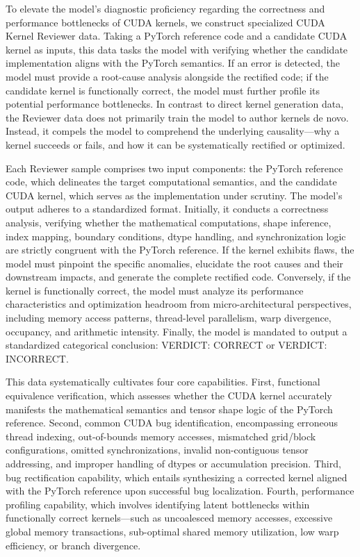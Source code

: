 \documentclass[
  10
]{article}
\begin{document}
To elevate the model's diagnostic proficiency regarding the correctness
and performance bottlenecks of CUDA kernels, we construct specialized
CUDA Kernel Reviewer data. Taking a PyTorch reference code and a
candidate CUDA kernel as inputs, this data tasks the model with
verifying whether the candidate implementation aligns with the PyTorch
semantics. If an error is detected, the model must provide a root-cause
analysis alongside the rectified code; if the candidate kernel is
functionally correct, the model must further profile its potential
performance bottlenecks. In contrast to direct kernel generation data,
the Reviewer data does not primarily train the model to author kernels
de novo. Instead, it compels the model to comprehend the underlying
causality---why a kernel succeeds or fails, and how it can be
systematically rectified or optimized.

Each Reviewer sample comprises two input components: the PyTorch
reference code, which delineates the target computational semantics, and
the candidate CUDA kernel, which serves as the implementation under
scrutiny. The model's output adheres to a standardized format.
Initially, it conducts a correctness analysis, verifying whether the
mathematical computations, shape inference, index mapping, boundary
conditions, dtype handling, and synchronization logic are strictly
congruent with the PyTorch reference. If the kernel exhibits flaws, the
model must pinpoint the specific anomalies, elucidate the root causes
and their downstream impacts, and generate the complete rectified code.
Conversely, if the kernel is functionally correct, the model must
analyze its performance characteristics and optimization headroom from
micro-architectural perspectives, including memory access patterns,
thread-level parallelism, warp divergence, occupancy, and arithmetic
intensity. Finally, the model is mandated to output a standardized
categorical conclusion: VERDICT: CORRECT or VERDICT: INCORRECT.

This data systematically cultivates four core capabilities. First,
functional equivalence verification, which assesses whether the CUDA
kernel accurately manifests the mathematical semantics and tensor shape
logic of the PyTorch reference. Second, common CUDA bug identification,
encompassing erroneous thread indexing, out-of-bounds memory accesses,
mismatched grid/block configurations, omitted synchronizations, invalid
non-contiguous tensor addressing, and improper handling of dtypes or
accumulation precision. Third, bug rectification capability, which
entails synthesizing a corrected kernel aligned with the PyTorch
reference upon successful bug localization. Fourth, performance
profiling capability, which involves identifying latent bottlenecks
within functionally correct kernels---such as uncoalesced memory
accesses, excessive global memory transactions, sub-optimal shared
memory utilization, low warp efficiency, or branch divergence.
\end{document}
